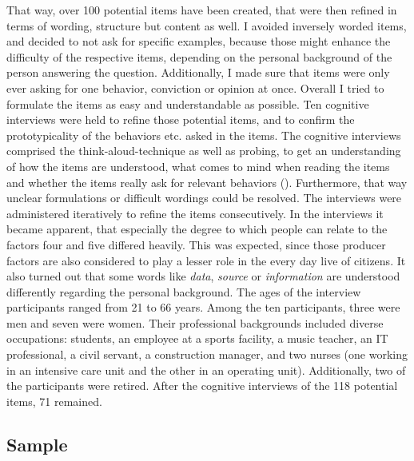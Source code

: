 \documentclass[
  12pt,
  a4paper,
  twoside]{article}
\begin{document}
That way, over 100 potential items have been created, that were then refined in terms of wording, structure but content as well.
I avoided inversely worded items, and decided to not ask for specific examples, because those might enhance the difficulty of the respective items, depending on the personal background of the person answering the question.
Additionally, I made sure that items were only ever asking for one behavior, conviction or opinion at once.
Overall I tried to formulate the items as easy and understandable as possible.
Ten cognitive interviews were held to refine those potential items, and to confirm the prototypicality of the behaviors etc. asked in the items.
The cognitive interviews comprised the think-aloud-technique as well as probing, to get an understanding of how the items are understood, what comes to mind when reading the items and whether the items really ask for relevant behaviors (). Furthermore, that way unclear formulations or difficult wordings could be resolved.
The interviews were administered iteratively to refine the items consecutively.
In the interviews it became apparent, that especially the degree to which people can relate to the factors four and five differed heavily. This was expected, since those producer factors are also considered to play a lesser role in the every day live of citizens. It also turned out that some words like \emph{data}, \emph{source} or \emph{information} are understood differently regarding the personal background.
The ages of the interview participants ranged from 21 to 66 years. Among the ten participants, three were men and seven were women. Their professional backgrounds included diverse occupations: students, an employee at a sports facility, a music teacher, an IT professional, a civil servant, a construction manager, and two nurses (one working in an intensive care unit and the other in an operating unit). Additionally, two of the participants were retired.
After the cognitive interviews of the 118 potential items, 71 remained.

\subsection{Sample}\label{sample}
\end{document}
